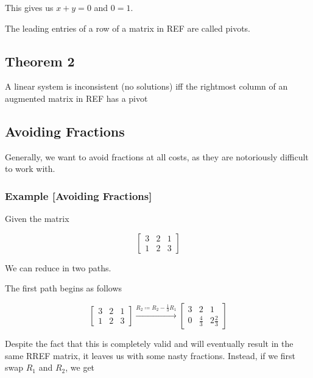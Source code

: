 \documentclass[12pt]{article}
\begin{document}
This gives us $x+y = 0$ and $0=1$.

The leading entries of a row of a matrix in REF are called pivots.

\subsection{Theorem 2}

A linear system is inconsistent (no solutions) iff the rightmost column of
an augmented matrix in REF has a pivot

\subsection{Avoiding Fractions}

Generally, we want to avoid fractions at all costs, as they are notoriously
difficult to work with.

\subsubsection{Example [Avoiding Fractions]}

Given the matrix

\[
  \begin{bmatrix}
    3 & 2 & 1 \\
    1 & 2 & 3
  \end{bmatrix}
\]

We can reduce in two paths.

The first path begins as follows

\[
  \begin{bmatrix}
    3 & 2 & 1 \\
    1 & 2 & 3
  \end{bmatrix}
  \xrightarrow{R_2\coloneqq R_2-\frac{1}{3} R_1}
  \begin{bmatrix}
    3 & 2 & 1 \\
    0 & \frac{4}{3} & 2\frac{2}{3}
  \end{bmatrix}
\]

Despite the fact that this is completely valid and will eventually result in
the same RREF matrix, it leaves us with some nasty fractions. Instead, if we
first swap $R_1$ and $R_2$, we get
\end{document}
